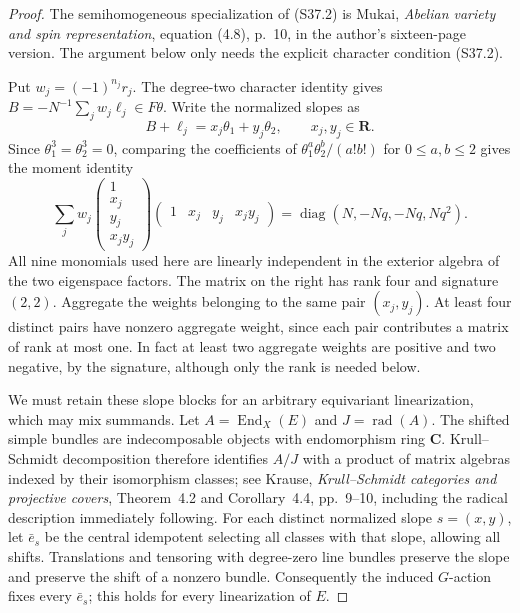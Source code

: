 \documentclass[11pt,a4paper]{article}
\theoremstyle{definition}
\begin{document}
\begin{proof}
The semihomogeneous specialization of (S37.2) is Mukai,
\emph{Abelian variety and spin representation}, equation
(4.8), p.~10, in the author's sixteen-page version.
The argument below only needs the explicit character
condition (S37.2).

Put $w_j=(-1)^{n_j}r_j$. The degree-two character
identity gives
$B=-N^{-1}\sum_jw_j\ell_j\in F\theta$.
Write the normalized slopes as
\[
 B+\ell_j=x_j\theta_1+y_j\theta_2,
 \qquad x_j,y_j\in\mathbf R.
\]
Since $\theta_1^3=\theta_2^3=0$, comparing the
coefficients of $\theta_1^a\theta_2^b/(a!b!)$
for $0\le a,b\le2$ gives the moment identity
\[
 \sum_j w_j
 \begin{pmatrix}1\\x_j\\y_j\\x_jy_j\end{pmatrix}
 \begin{pmatrix}1&x_j&y_j&x_jy_j\end{pmatrix}
 =\operatorname{diag}(N,-Nq,-Nq,Nq^2).
 \tag{S37.4}
\]
All nine monomials used here are linearly independent
in the exterior algebra of the two eigenspace factors.
The matrix on the right has rank four and signature
$(2,2)$. Aggregate the weights belonging to the same
pair $(x_j,y_j)$. At least four distinct pairs have
nonzero aggregate weight, since each pair contributes
a matrix of rank at most one. In fact at least two
aggregate weights are positive and two negative, by
the signature, although only the rank is needed below.

We must retain these slope blocks for an arbitrary
equivariant linearization, which may mix summands.
Let $A=\operatorname{End}_X(E)$ and $J=\operatorname{rad}(A)$.
The shifted simple bundles are indecomposable objects
with endomorphism ring $\mathbf C$. Krull--Schmidt
decomposition therefore identifies $A/J$ with a product
of matrix algebras indexed by their isomorphism classes;
see Krause, \emph{Krull--Schmidt categories and projective
covers}, Theorem~4.2 and Corollary~4.4, pp.~9--10,
including the radical description immediately following.
For each distinct normalized slope $s=(x,y)$, let
$\bar e_s$ be the central idempotent selecting all
classes with that slope, allowing all shifts.
Translations and tensoring with degree-zero line bundles
preserve the slope and preserve the shift of a nonzero
bundle. Consequently the induced $G$-action fixes every
$\bar e_s$; this holds for every linearization of $E$.


\end{proof}
\end{document}
